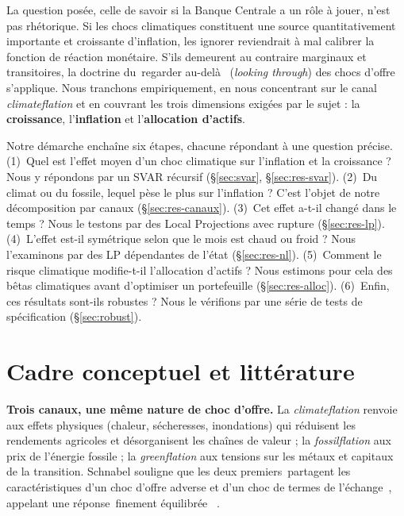 \documentclass[11pt,a4paper]{article}
\providecommand{\og}{\guillemotleft\,}
\providecommand{\fg}{\,\guillemotright}
\begin{document}
La question posée, celle de savoir si la Banque Centrale a un rôle à jouer, n'est pas
rhétorique. Si les chocs climatiques constituent une source quantitativement importante et
croissante d'inflation, les ignorer reviendrait à mal calibrer la fonction de
réaction monétaire. S'ils demeurent au contraire marginaux et transitoires, la doctrine du \og regarder
au-delà \fg{} (\emph{looking through}) des chocs d'offre s'applique. Nous tranchons
empiriquement, en nous concentrant sur le canal \emph{climateflation} et en couvrant les
trois dimensions exigées par le sujet : la \textbf{croissance}, l'\textbf{inflation} et
l'\textbf{allocation d'actifs}.

Notre démarche enchaîne six étapes, chacune répondant à une question précise. (1)~Quel est
l'effet moyen d'un choc climatique sur l'inflation et la croissance ? Nous y répondons par un
SVAR récursif (\S\ref{sec:svar}, \S\ref{sec:res-svar}). (2)~Du climat ou du fossile, lequel
pèse le plus sur l'inflation ? C'est l'objet de notre décomposition par canaux
(\S\ref{sec:res-canaux}). (3)~Cet effet a-t-il changé dans le temps ? Nous le testons par des
Local Projections avec rupture (\S\ref{sec:res-lp}). (4)~L'effet est-il symétrique selon que
le mois est chaud ou froid ? Nous l'examinons par des LP dépendantes de l'état
(\S\ref{sec:res-nl}). (5)~Comment le risque climatique modifie-t-il l'allocation d'actifs ?
Nous estimons pour cela des bêtas climatiques avant d'optimiser un portefeuille
(\S\ref{sec:res-alloc}). (6)~Enfin, ces résultats sont-ils robustes ? Nous le vérifions par
une série de tests de spécification (\S\ref{sec:robust}).

\section{Cadre conceptuel et littérature}
\label{sec:litt}
\textbf{Trois canaux, une même nature de choc d'offre.} La \emph{climateflation} renvoie aux
effets physiques (chaleur, sécheresses, inondations) qui réduisent les rendements
agricoles et désorganisent les chaînes de valeur ; la \emph{fossilflation} aux prix de
l'énergie fossile ; la \emph{greenflation} aux tensions sur les métaux et capitaux de la
transition. Schnabel souligne que les deux premiers \og partagent les caractéristiques d'un
choc d'offre adverse et d'un choc de termes de l'échange \fg, appelant une réponse
\og finement équilibrée \fg{} \citep{schnabel2022}.
\end{document}
